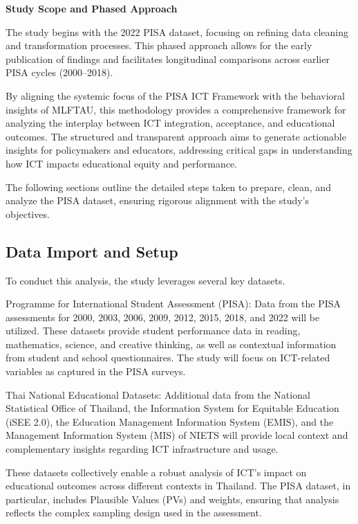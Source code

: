 \documentclass[
]{article}
\begin{document}
\textbf{Study Scope and Phased Approach}

The study begins with the 2022 PISA dataset, focusing on refining data
cleaning and transformation processes. This phased approach allows for
the early publication of findings and facilitates longitudinal
comparisons across earlier PISA cycles (2000--2018).

By aligning the systemic focus of the PISA ICT Framework with the
behavioral insights of MLFTAU, this methodology provides a comprehensive
framework for analyzing the interplay between ICT integration,
acceptance, and educational outcomes. The structured and transparent
approach aims to generate actionable insights for policymakers and
educators, addressing critical gaps in understanding how ICT impacts
educational equity and performance.

The following sections outline the detailed steps taken to prepare,
clean, and analyze the PISA dataset, ensuring rigorous alignment with
the study's objectives.

\hypertarget{data-import-and-setup}{%
\subsection{Data Import and Setup}\label{data-import-and-setup}}

To conduct this analysis, the study leverages several key datasets.

Programme for International Student Assessment (PISA): Data from the
PISA assessments for 2000, 2003, 2006, 2009, 2012, 2015, 2018, and 2022
will be utilized. These datasets provide student performance data in
reading, mathematics, science, and creative thinking, as well as
contextual information from student and school questionnaires. The study
will focus on ICT-related variables as captured in the PISA surveys.

Thai National Educational Datasets: Additional data from the National
Statistical Office of Thailand, the Information System for Equitable
Education (iSEE 2.0), the Education Management Information System
(EMIS), and the Management Information System (MIS) of NIETS will
provide local context and complementary insights regarding ICT
infrastructure and usage.

These datasets collectively enable a robust analysis of ICT's impact on
educational outcomes across different contexts in Thailand. The PISA
dataset, in particular, includes Plausible Values (PVs) and weights,
ensuring that analysis reflects the complex sampling design used in the
assessment.
\end{document}
